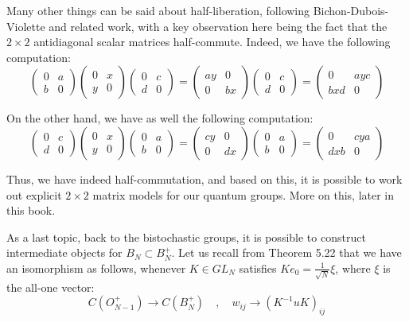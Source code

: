 \documentclass[12pt]{amsbook}
\begin{document}
Many other things can be said about half-liberation, following Bichon-Dubois-Violette \cite{bd1} and related work, with a key observation here being the fact that the $2\times2$ antidiagonal scalar matrices half-commute. Indeed, we have the following computation:
$$\begin{pmatrix}0&a\\b&0\end{pmatrix}
\begin{pmatrix}0&x\\y&0\end{pmatrix}
\begin{pmatrix}0&c\\d&0\end{pmatrix}
=\begin{pmatrix}ay&0\\0&bx\end{pmatrix}
\begin{pmatrix}0&c\\d&0\end{pmatrix}
=\begin{pmatrix}0&ayc\\bxd&0\end{pmatrix}$$

On the other hand, we have as well the following computation:
$$\begin{pmatrix}0&c\\d&0\end{pmatrix}
\begin{pmatrix}0&x\\y&0\end{pmatrix}
\begin{pmatrix}0&a\\b&0\end{pmatrix}
=\begin{pmatrix}cy&0\\0&dx\end{pmatrix}
\begin{pmatrix}0&a\\b&0\end{pmatrix}
=\begin{pmatrix}0&cya\\dxb&0\end{pmatrix}$$

Thus, we have indeed half-commutation, and based on this, it is possible to work out explicit $2\times2$ matrix models for our quantum groups. More on this, later in this book.

\bigskip

As a last topic, back to the bistochastic groups, it is possible to construct intermediate objects for $B_N\subset B_N^+$. Let us recall from Theorem 5.22 that we have an isomorphism as follows, whenever $K\in GL_N$ satisfies $Ke_0=\frac{1}{\sqrt{N}}\xi$, where $\xi$ is the all-one vector:
$$C(O_{N-1}^+)\to C(B_N^+)\quad,\quad w_{ij}\to(K^{-1}uK)_{ij}$$
\end{document}
